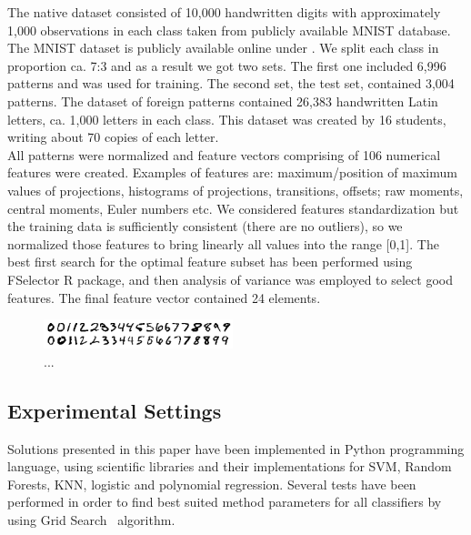 \documentclass{llncs}
\begin{document}
The native dataset consisted of 10,000 handwritten digits with approximately 1,000 observations in each class taken from publicly available MNIST database. The MNIST dataset is publicly available online under \cite{LeCunCortesBurges}. We split each class in proportion ca. 7:3 and as a result we got two sets. The first one included 6,996 patterns and was used for training. The second set, the test set, contained 3,004 patterns. The dataset of foreign patterns contained 26,383 handwritten Latin letters, ca. 1,000 letters in each class. This dataset was created by 16 students, writing about 70 copies of each letter. \\

All patterns were normalized and feature vectors comprising of 106 numerical features were created. Examples of features are: maximum/position of maximum values of projections, histograms of projections, transitions, offsets; raw moments, central moments, Euler numbers etc. We considered features standardization but the training data is sufficiently consistent (there are no outliers), so we normalized those features to bring linearly all values into the range [0,1]. The best first search for the optimal feature subset has been performed using FSelector R package, \cite{Romanski} and then analysis of variance was employed to select good features. The final feature vector contained 24 elements. 


\begin{figure}[!t]
  \centering
  \includegraphics[width=0.49\textwidth]{_Figures/native}
  \caption{...}
\label{fig:nativeforeignpatterns}
\end{figure}


\subsection{Experimental Settings}
\vspace{-3pt}

Solutions presented in this paper have been implemented in Python programming language, using scientific libraries \cite{NumPy,Scikit} and their implementations for SVM, Random Forests, KNN, logistic and polynomial regression. Several tests have been performed in order to find best suited method parameters for all classifiers by using Grid Search~\cite{Scikit} algorithm.
\end{document}
